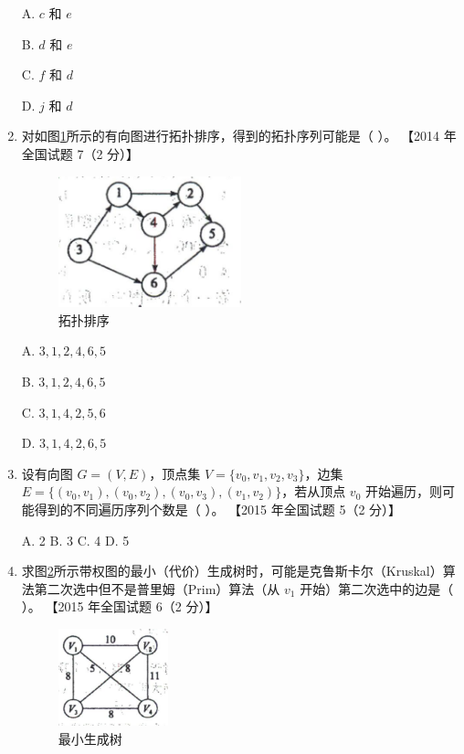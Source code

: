\documentclass[lang=cn,newtx,10pt,scheme=chinese]{../../elegantbook}
\begin{document}
\begin{enumerate}
        A. $c$ 和 $e$  

        B. $d$ 和 $e$  

        C. $f$ 和 $d$  

        D. $j$ 和 $d$  
    
        \item 对如图\ref{fig:7-19}所示的有向图进行拓扑排序，得到的拓扑序列可能是（ ）。  
        【2014 年全国试题 7（2 分）】  

        \begin{figure}[h!]
            \centering
            \includegraphics[width=0.5\textwidth]{../../figure/exercisePicPDF/chapter7/7-19.pdf}
            \caption{拓扑排序}
            \label{fig:7-19}
    \end{figure}

        A. $3, 1, 2, 4, 6, 5$  

        B. $3, 1, 2, 4, 6, 5$  

        C. $3, 1, 4, 2, 5, 6$  

        D. $3, 1, 4, 2, 6, 5$  
    
        \item 设有向图 $G = (V, E)$，顶点集 $V = \{v_0,v_1, v_2, v_3\}$，边集 $E = \{(v_0, v_1), (v_0, v_2), (v_0, v_3),(v_1,v_2)\}$，若从顶点 $v_0$ 开始遍历，则可能得到的不同遍历序列个数是（ ）。  
        【2015 年全国试题 5（2 分）】  

        A. 2 \quad B. 3 \quad C. 4 \quad D. 5  
    
        \item 求图\ref{fig:7-21}所示带权图的最小（代价）生成树时，可能是克鲁斯卡尔（Kruskal）算法第二次选中但不是普里姆（Prim）算法（从 $v_1$ 开始）第二次选中的边是（ ）。  
        【2015 年全国试题 6（2 分）】  

        \begin{figure}[h!]
            \centering
            \includegraphics[width=0.3\textwidth]{../../figure/exercisePicPDF/chapter7/7-21.pdf}
            \caption{最小生成树}
            \label{fig:7-21}
        \end{figure}


\end{enumerate}
\end{document}
